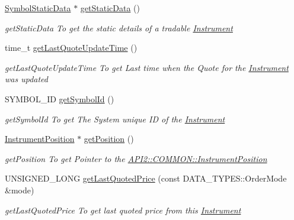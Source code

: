 \begin{DoxyCompactItemize}
\item 
\hyperlink{struct_a_p_i2_1_1_symbol_static_data}{Symbol\-Static\-Data} $\ast$ \hyperlink{class_a_p_i2_1_1_c_o_m_m_o_n_1_1_instrument_a8cac1a5b65b1356e27d2b49e0f70247f}{get\-Static\-Data} ()
\begin{DoxyCompactList}\small\item\em get\-Static\-Data To get the static details of a tradable \hyperlink{class_a_p_i2_1_1_c_o_m_m_o_n_1_1_instrument}{Instrument} \end{DoxyCompactList}\item 
time\-\_\-t \hyperlink{class_a_p_i2_1_1_c_o_m_m_o_n_1_1_instrument_a0c89f63049388223a0d1c78f0cfe93c3}{get\-Last\-Quote\-Update\-Time} ()
\begin{DoxyCompactList}\small\item\em get\-Last\-Quote\-Update\-Time To get Last time when the Quote for the \hyperlink{class_a_p_i2_1_1_c_o_m_m_o_n_1_1_instrument}{Instrument} was updated \end{DoxyCompactList}\item 
S\-Y\-M\-B\-O\-L\-\_\-\-I\-D \hyperlink{class_a_p_i2_1_1_c_o_m_m_o_n_1_1_instrument_a76b20f2b97286709e9dc005020ace814}{get\-Symbol\-Id} ()
\begin{DoxyCompactList}\small\item\em get\-Symbol\-Id To get The System unique I\-D of the \hyperlink{class_a_p_i2_1_1_c_o_m_m_o_n_1_1_instrument}{Instrument} \end{DoxyCompactList}\item 
\hyperlink{struct_a_p_i2_1_1_c_o_m_m_o_n_1_1_instrument_position}{Instrument\-Position} $\ast$ \hyperlink{class_a_p_i2_1_1_c_o_m_m_o_n_1_1_instrument_a1da59722fd5bb50700be03771b03c2bb}{get\-Position} ()
\begin{DoxyCompactList}\small\item\em get\-Position To get Pointer to the \hyperlink{struct_a_p_i2_1_1_c_o_m_m_o_n_1_1_instrument_position}{A\-P\-I2\-::\-C\-O\-M\-M\-O\-N\-::\-Instrument\-Position} \end{DoxyCompactList}\item 
U\-N\-S\-I\-G\-N\-E\-D\-\_\-\-L\-O\-N\-G \hyperlink{class_a_p_i2_1_1_c_o_m_m_o_n_1_1_instrument_ac6727da5584746a474938d42ede3b82a}{get\-Last\-Quoted\-Price} (const D\-A\-T\-A\-\_\-\-T\-Y\-P\-E\-S\-::\-Order\-Mode \&mode)
\begin{DoxyCompactList}\small\item\em get\-Last\-Quoted\-Price To get last quoted price from this \hyperlink{class_a_p_i2_1_1_c_o_m_m_o_n_1_1_instrument}{Instrument} \end{DoxyCompactList}\end{DoxyCompactItemize}


